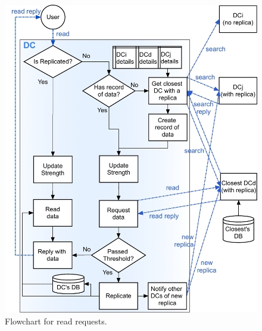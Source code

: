 \documentclass[english]{article}
\begin{document}
\begin{figure}[htpb!]
	\includegraphics[width=1\textwidth]{figures/readRequestFlowchart.png}

	\caption{Flowchart for read requests.}
	\label{fig:read_flowchart}
\end{figure}
\end{document}
